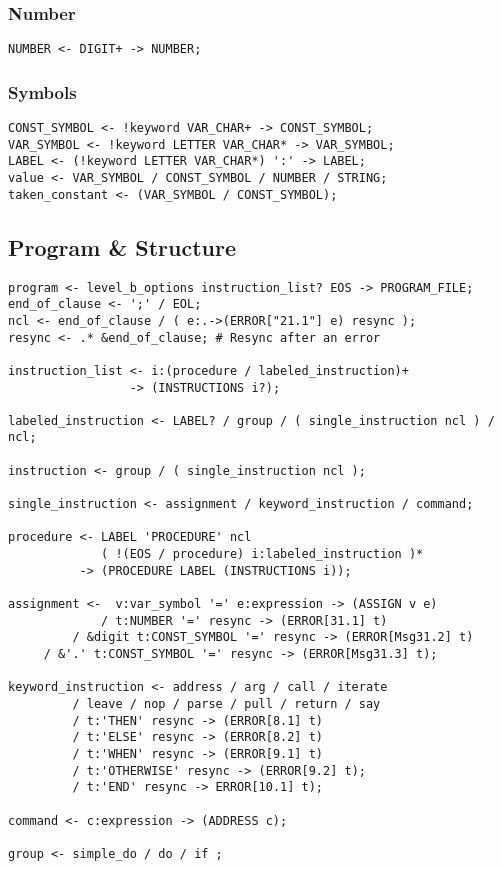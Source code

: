 \subsubsection{Number}

\begin{verbatim}
NUMBER <- DIGIT+ -> NUMBER;
\end{verbatim}

\subsubsection{Symbols}

\begin{verbatim}
CONST_SYMBOL <- !keyword VAR_CHAR+ -> CONST_SYMBOL;
VAR_SYMBOL <- !keyword LETTER VAR_CHAR* -> VAR_SYMBOL;
LABEL <- (!keyword LETTER VAR_CHAR*) ':' -> LABEL;
value <- VAR_SYMBOL / CONST_SYMBOL / NUMBER / STRING;
taken_constant <- (VAR_SYMBOL / CONST_SYMBOL);
\end{verbatim}

\subsection{Program \& Structure}

\begin{verbatim}
program <- level_b_options instruction_list? EOS -> PROGRAM_FILE;
end_of_clause <- ';' / EOL;
ncl <- end_of_clause / ( e:.->(ERROR["21.1"] e) resync ); 
resync <- .* &end_of_clause; # Resync after an error

instruction_list <- i:(procedure / labeled_instruction)+ 
                 -> (INSTRUCTIONS i?);

labeled_instruction <- LABEL? / group / ( single_instruction ncl ) / ncl;

instruction <- group / ( single_instruction ncl );

single_instruction <- assignment / keyword_instruction / command;

procedure <- LABEL 'PROCEDURE' ncl 
             ( !(EOS / procedure) i:labeled_instruction )*
          -> (PROCEDURE LABEL (INSTRUCTIONS i));

assignment <-  v:var_symbol '=' e:expression -> (ASSIGN v e)
             / t:NUMBER '=' resync -> (ERROR[31.1] t) 
         / &digit t:CONST_SYMBOL '=' resync -> (ERROR[Msg31.2] t)
	 / &'.' t:CONST_SYMBOL '=' resync -> (ERROR[Msg31.3] t);

keyword_instruction <- address / arg / call / iterate 
         / leave / nop / parse / pull / return / say  
	     / t:'THEN' resync -> (ERROR[8.1] t) 
	     / t:'ELSE' resync -> (ERROR[8.2] t) 
    	 / t:'WHEN' resync -> (ERROR[9.1] t)
	     / t:'OTHERWISE' resync -> (ERROR[9.2] t);
         / t:'END' resync -> ERROR[10.1] t);

command <- c:expression -> (ADDRESS c);

group <- simple_do / do / if ;
\end{verbatim}

